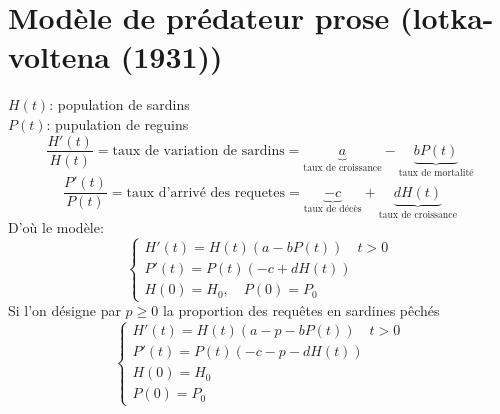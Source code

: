 \section{Modèle de prédateur prose (lotka-voltena (1931))}
$H(t)$: population de sardins\\
$P(t)$: pupulation de reguins
 \[
     \frac{H'(t)}{H(t)} = \text{taux de variation de sardins} = \underbrace{a}_{\text{taux de croissance}} - \underbrace{b P(t)}_{\text{taux de mortalité}}
\] 
\[
    \frac{P'(t)}{P(t)} = \text{taux d'arrivé des requetes} = \underbrace{-c}_{\text{taux de décès}} + \underbrace{d H(t)}_{\text{taux de croissance}}
\] 
D'où le modèle:
\[
\begin{cases}
    H'(t) = H(t)(a - b P(t)) \quad t>0\\
    P'(t) = P(t)(-c + d H(t))\\
    H(0) = H_0, \quad P(0) = P_0
\end{cases}
\] 
Si l'on désigne par $p\ge 0$ la proportion des requêtes en sardines pêchés
\[
\begin{cases}
    H'(t) = H(t)(a - p - b P(t)) \quad t > 0\\
    P'(t) = P(t)(-c - p - d H(t))\\
    H(0) = H_0\\
    P(0) = P_0
\end{cases}
\] 
